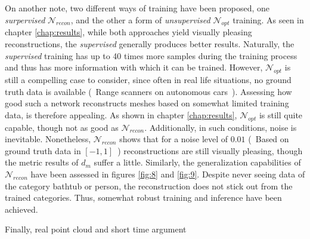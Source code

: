   On another note, two different ways of training have been proposed, one \emph{surpervised} $\mathcal{N}_{recon}$, and the other a form of
  \emph{unsupervised} $\mathcal{N}_{opt}$ training. 
  As seen in chapter \ref{chap:results}, while both approaches yield visually pleasing reconstructions, the \emph{supervised} generally 
  produces better results. Naturally, the \emph{supervised} training has up to 40 times more samples during the training process and thus 
  has more information with which it can be trained. However, $\mathcal{N}_{opt}$ is still a compelling case to consider, since often in
  real life situations, no ground truth data is available (~Range scanners on autonomous cars~). Assessing how good such a network reconstructs
  meshes based on somewhat limited training data, is therefore appealing. As shown in chapter \ref{chap:results}, $\mathcal{N}_{opt}$ is still
  quite capable, though not as good as $\mathcal{N}_{recon}$. 
  Additionally, in such conditions, noise is inevitable. Nonetheless, $\mathcal{N}_{recon}$ shows that for a noise level of $0.01$ (~Based on ground 
  truth data in $[-1,1]$~) reconstructions are still visually pleasing, though the metric results of $d_m$ suffer a little. 
  Similarly, the generalization capabilities of $\mathcal{N}_{recon}$ have been assessed in figures \ref{fig:8} and \ref{fig:9}. Despite never seeing
  data of the category bathtub or person, the reconstruction does not stick out from the trained categories. Thus, somewhat robust training and inference have been achieved. 

Finally, real point cloud and short time argument

